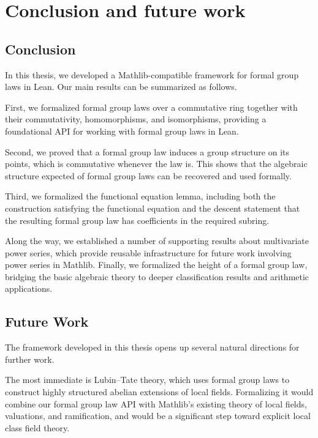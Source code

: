\chapter*{Conclusion and future work}

\section*{Conclusion}

In this thesis, we developed a Mathlib-compatible framework for formal
group laws in Lean.  Our main results can be summarized as follows.

First, we formalized formal group laws over a commutative ring together
with their commutativity, homomorphisms, and isomorphisms, providing a
foundational API for working with formal group laws in Lean.

Second, we proved that a formal group law induces a group structure on
its points, which is commutative whenever the law is.  This shows that
the algebraic structure expected of formal group laws can be recovered
and used formally.

Third, we formalized the functional equation lemma, including both the
construction satisfying the functional equation and the descent
statement that the resulting formal group law has coefficients in the
required subring.

Along the way, we established a number of supporting results about
multivariate power series, which provide reusable infrastructure for
future work involving power series in Mathlib.  Finally, we formalized
the height of a formal group law, bridging the basic algebraic theory to
deeper classification results and arithmetic applications.

\section*{Future Work}

The framework developed in this thesis opens up several natural
directions for further work.

The most immediate is Lubin--Tate theory, which uses formal group laws to
construct highly structured abelian extensions of local fields.
Formalizing it would combine our formal group law API with Mathlib's
existing theory of local fields, valuations, and ramification, and would
be a significant step toward explicit local class field theory.

